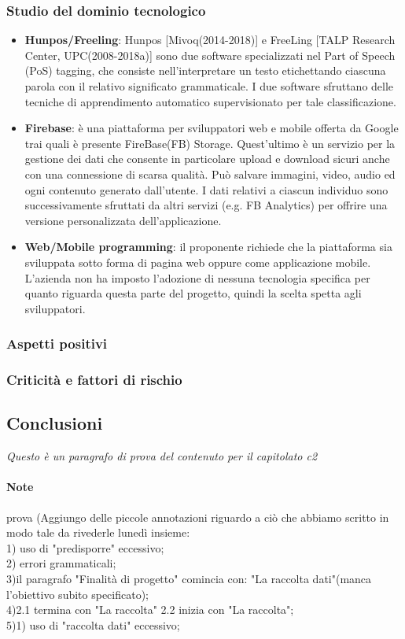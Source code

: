 \subsubsection{Studio del dominio tecnologico}
\begin{itemize}
	\item \textbf{Hunpos/Freeling}: Hunpos [Mivoq(2014-2018)] e FreeLing [TALP Research Center, UPC(2008-2018a)] sono due software specializzati nel Part of Speech (PoS) tagging, che consiste nell'interpretare un testo etichettando ciascuna parola con il relativo significato grammaticale. I due software sfruttano delle tecniche di apprendimento automatico supervisionato per tale classificazione.  
	
	\item \textbf{Firebase}: è una piattaforma per sviluppatori web e mobile offerta da Google trai quali è presente FireBase(FB) Storage. Quest'ultimo è un servizio per la gestione dei dati che consente in particolare upload e download sicuri anche con una connessione di scarsa qualità. Può salvare immagini, video, audio ed ogni contenuto generato dall'utente. I dati relativi a ciascun individuo sono successivamente sfruttati da altri servizi (e.g. FB Analytics) per offrire una versione personalizzata dell'applicazione.
	\item \textbf{Web/Mobile programming}: il proponente richiede che la piattaforma sia sviluppata sotto forma di pagina web oppure come applicazione mobile. L'azienda non ha imposto l'adozione di nessuna tecnologia specifica per quanto riguarda questa parte del progetto, quindi la scelta spetta agli sviluppatori.		
\end{itemize}
\subsubsection{Aspetti positivi}
\subsubsection{Criticità e fattori di rischio}
\subsection{Conclusioni}
\textit{Questo è un paragrafo di prova del contenuto per il capitolato c2}
\paragraph{Note}
prova (Aggiungo delle piccole annotazioni riguardo a ciò che abbiamo scritto in modo tale da rivederle lunedì insieme:\\ 
1) uso di "predisporre" eccessivo;\\
2) errori grammaticali;\\
3)il paragrafo "Finalità di progetto" comincia con: "La raccolta dati"(manca l'obiettivo subito specificato);\\
4)2.1 termina con "La raccolta" 2.2 inizia con "La raccolta";\\
5)1) uso di "raccolta dati" eccessivo;\\